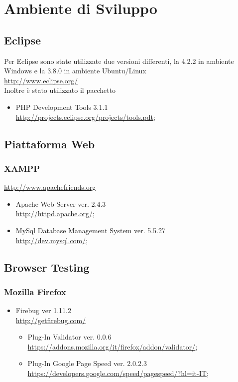    \section{Ambiente di Sviluppo}
    \subsection{Eclipse}
      Per Eclipse sono state utilizzate due versioni differenti, la 4.2.2 in ambiente Windows e la 3.8.0 in ambiente Ubuntu/Linux \\
      \href{http://www.eclipse.org/}{http://www.eclipse.org/} \\
      Inoltre è stato utilizzato il pacchetto
      \begin{itemize}
       \item PHP Development Tools 3.1.1 \\
       \href{http://projects.eclipse.org/projects/tools.pdt}{http://projects.eclipse.org/projects/tools.pdt};
       
      \end{itemize}
    \subsection{Piattaforma Web}
      \subsubsection{XAMPP}
      \href{http://www.apachefriends.org}{http://www.apachefriends.org}
      \begin{itemize}
       \item Apache Web Server ver. 2.4.3 \\
	  \href{http://httpd.apache.org/}{http://httpd.apache.org/};
       \item MySql Database Management System ver. 5.5.27 \\
	  \href{http://dev.mysql.com/}{http://dev.mysql.com/};
      \end{itemize}
    \subsection{Browser Testing}
      \subsubsection{Mozilla Firefox}
	\begin{itemize}
	 \item Firebug ver 1.11.2 \\
	  \href{http://getfirebug.com/}{http://getfirebug.com/}
	    \begin{itemize}
	     \item Plug-In Validator ver. 0.0.6 \\
	      \href{https://addons.mozilla.org/it/firefox/addon/validator/}{https://addons.mozilla.org/it/firefox/addon/validator/};
	     \item Plug-In Google Page Speed ver. 2.0.2.3 \\
	      \href{https://developers.google.com/speed/pagespeed/?hl=it-IT}{https://developers.google.com/speed/pagespeed/?hl=it-IT};
	    \end{itemize}
	\end{itemize}
